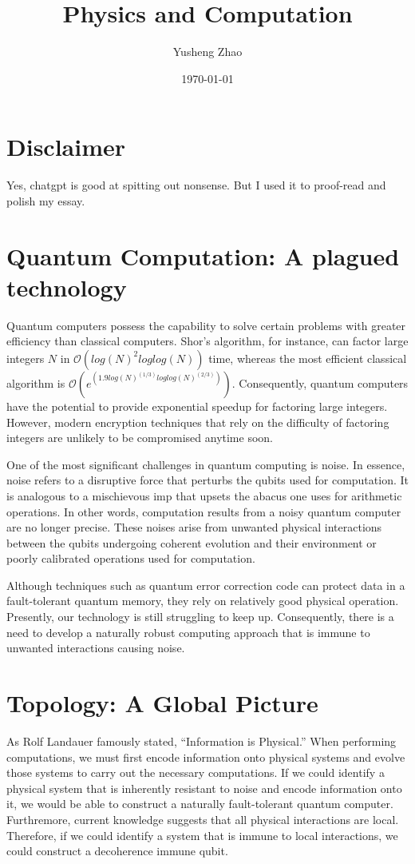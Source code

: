 \documentclass[11pt]{article}
\author{Yusheng Zhao}
\date{\today}
\title{Physics and Computation}
\begin{document}
\maketitle

\section{Disclaimer}
\label{sec:orgaecc385}
Yes, chatgpt is good at spitting out nonsense. But I used it to proof-read and
polish my essay.

\section{Quantum Computation: A plagued technology}
\label{sec:orga2439d9}
Quantum computers possess the capability to solve certain problems with greater
efficiency than classical computers. Shor's algorithm, for instance, can factor
large integers \(N\) in \(\mathcal{O}(log(N)^2 loglog(N))\) time, whereas the most
efficient classical algorithm is \(\mathcal{O}(e^(1.9 log(N)^(1/3)
loglog(N)^(2/3)))\)\cite{ShorAlgorithm2023}. Consequently, quantum computers have the potential to
provide exponential speedup for factoring large integers. However, modern
encryption techniques that rely on the difficulty of factoring integers are
unlikely to be compromised anytime soon.

One of the most significant challenges in quantum computing is noise. In
essence, noise refers to a disruptive force that perturbs the qubits used for
computation. It is analogous to a mischievous imp that upsets the abacus one
uses for arithmetic operations. In other words, computation results from a noisy
quantum computer are no longer precise. These noises arise from unwanted
physical interactions between the qubits undergoing coherent evolution and their
environment or poorly calibrated operations used for computation.

Although techniques such as quantum error correction code can protect data in a
fault-tolerant quantum memory, they rely on relatively good physical
operation\cite{girvinIntroductionQuantumError2022}. Presently, our technology is
still struggling to keep up\cite{kitaevUnpairedMajoranaFermions2001}.
Consequently, there is a need to develop a naturally robust computing approach
that is immune to unwanted interactions causing noise.

\section{Topology: A Global Picture}
\label{sec:orgadefa82}
As Rolf Landauer famously stated, ``Information is
Physical.'' \cite{landauerThereAreNo1991} When performing computations, we must
first encode information onto physical systems and evolve those systems to carry
out the necessary computations. If we could identify a physical system that is
inherently resistant to noise and encode information onto it, we would be able
to construct a naturally fault-tolerant quantum computer. Furthremore, current
knowledge suggests that all physical interactions are local. Therefore, if we
could identify a system that is immune to local interactions, we could construct
a decoherence immune qubit.
\end{document}
